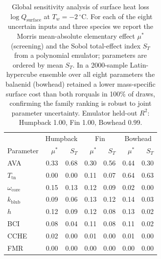 \begin{table}[htbp]
\centering
\caption{Global sensitivity analysis of surface heat loss $\log Q_{\mathrm{surface}}$ at $T_w=-2\,^\circ$C. For each of the eight uncertain inputs and three species we report the Morris mean-absolute elementary effect $\mu^{*}$ (screening) and the Sobol total-effect index $S_T$ from a polynomial emulator; parameters are ordered by mean $S_T$. In a 2000-sample Latin-hypercube ensemble over all eight parameters the balaenid (bowhead) retained a lower mass-specific surface cost than both rorquals in 100\% of draws, confirming the family ranking is robust to joint parameter uncertainty. Emulator held-out $R^2$: Humpback 1.00, Fin 1.00, Bowhead 0.99.}
\label{tab:gsa}
\begin{tabular}{lrrrrrr}
\hline
& \multicolumn{2}{c}{Humpback} & \multicolumn{2}{c}{Fin} & \multicolumn{2}{c}{Bowhead} \\
Parameter & $\mu^{*}$ & $S_T$ & $\mu^{*}$ & $S_T$ & $\mu^{*}$ & $S_T$ \\
\hline
AVA & 0.33 & 0.68 & 0.30 & 0.56 & 0.44 & 0.30 \\
$T_{\mathrm{tn}}$ & 0.00 & 0.00 & 0.11 & 0.07 & 0.64 & 0.63 \\
$\omega_{\mathrm{core}}$ & 0.15 & 0.13 & 0.12 & 0.09 & 0.02 & 0.00 \\
$k_{\mathrm{blub}}$ & 0.09 & 0.06 & 0.13 & 0.12 & 0.14 & 0.03 \\
$h$ & 0.12 & 0.09 & 0.12 & 0.08 & 0.13 & 0.02 \\
BCI & 0.08 & 0.04 & 0.11 & 0.08 & 0.11 & 0.02 \\
CCHE & 0.02 & 0.00 & 0.01 & 0.00 & 0.01 & 0.00 \\
FMR & 0.00 & 0.00 & 0.00 & 0.00 & 0.00 & 0.00 \\
\hline
\end{tabular}
\end{table}
